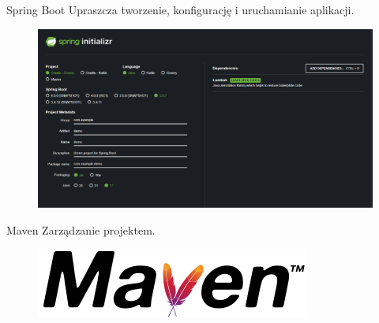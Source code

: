 \begin{frame}{\insertsection}
	\begin{block}{Spring Boot}
		Upraszcza tworzenie, konfigurację i uruchamianie aplikacji.
	\end{block}
	\begin{figure}
		\centering
		\includegraphics[width=0.9\linewidth]{../images/springInit}
		\label{fig:springinit}
	\end{figure}
\end{frame}

\begin{frame}{\insertsection}
	\begin{block}{Maven}
		Zarządzanie projektem.
	\end{block}
	\begin{figure}
		\centering
		\includegraphics[width=0.9\linewidth]{../images/MavenLogo}
		\label{fig:mavenlogo}
	\end{figure}
\end{frame}

